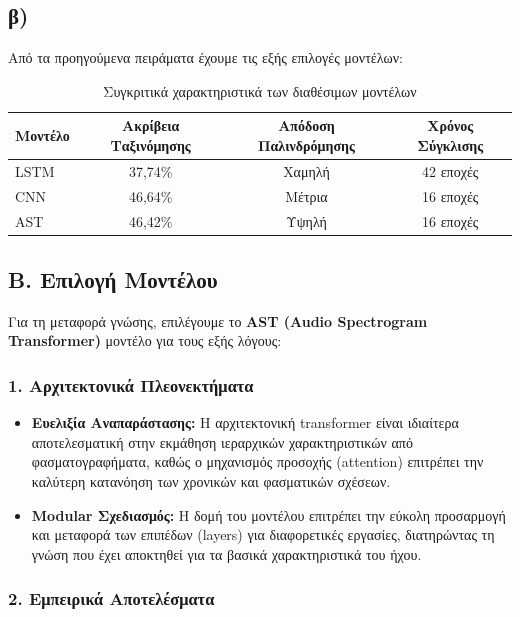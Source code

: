 \documentclass[a4paper,12pt]{article}
\begin{document}
\subsection*{β)}

Από τα προηγούμενα πειράματα έχουμε τις εξής επιλογές μοντέλων:

\begin{table}[H]
    \centering
    \begin{tabular}{lccc}
    \toprule
    \textbf{Μοντέλο} & \textbf{Ακρίβεια Ταξινόμησης} & \textbf{Απόδοση Παλινδρόμησης} & \textbf{Χρόνος Σύγκλισης} \\
    \midrule
    LSTM & 37,74\% & Χαμηλή & 42 εποχές \\
    CNN & 46,64\% & Μέτρια & 16 εποχές \\
    AST & 46,42\% & Υψηλή & 16 εποχές \\
    \bottomrule
    \end{tabular}
    \caption{Συγκριτικά χαρακτηριστικά των διαθέσιμων μοντέλων}
\end{table}

\subsection*{Β. Επιλογή Μοντέλου}

Για τη μεταφορά γνώσης, επιλέγουμε το \textbf{AST (Audio Spectrogram Transformer)} μοντέλο για τους εξής λόγους:

\subsubsection*{1. Αρχιτεκτονικά Πλεονεκτήματα}

\begin{itemize}
    \item \textbf{Ευελιξία Αναπαράστασης:} Η αρχιτεκτονική transformer είναι ιδιαίτερα αποτελεσματική στην εκμάθηση ιεραρχικών χαρακτηριστικών από φασματογραφήματα, καθώς ο μηχανισμός προσοχής (attention) επιτρέπει την καλύτερη κατανόηση των χρονικών και φασματικών σχέσεων.

    \item \textbf{Modular Σχεδιασμός:} Η δομή του μοντέλου επιτρέπει την εύκολη προσαρμογή και μεταφορά των επιπέδων (layers) για διαφορετικές εργασίες, διατηρώντας τη γνώση που έχει αποκτηθεί για τα βασικά χαρακτηριστικά του ήχου.
\end{itemize}

\subsubsection*{2. Εμπειρικά Αποτελέσματα}
\end{document}
